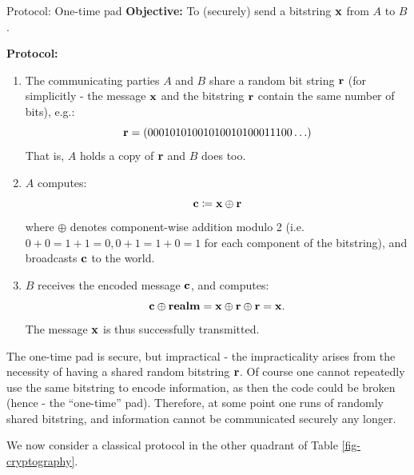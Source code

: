 \begin{blankbox}{Protocol: One-time pad}
    \textbf{Objective:} To (securely) send a bitstring $\mathbf{x}$ from $A$ to $B$.

    \noindent
    \textbf{Protocol:}
    \begin{enumerate}
        \item The communicating parties $A$ and $B$ share a random bit string $\mathbf{r}$ (for simplicitly - the message $\mathbf{x}$ and the bitstring $\mathbf{r}$ contain the same number of bits), e.g.:
        \begin{equation}
            \mathbf{r} = (00010101001010010100011100\ldots)
        \end{equation}
        That is, $A$ holds a copy of $\mathbf{r}$ and $B$ does too.
        \item $A$ computes:
        \begin{equation}
            \mathbf{c} \coloneqq \mathbf{x} \oplus \mathbf{r}
        \end{equation}
        where $\oplus$ denotes component-wise addition modulo 2 (i.e. $0 + 0 = 1 + 1 = 0, 0 + 1 = 1 + 0 = 1$ for each component of the bitstring), and broadcasts $\mathbf{c}$ to the world.
        \item $B$ receives the encoded message $\mathbf{c}$, and computes:
        \begin{equation}
            \mathbf{c} \oplus \mathbf{realm} = \mathbf{x} \oplus \mathbf{r} \oplus \mathbf{r} = \mathbf{x}.
        \end{equation}
        The message $\mathbf{x}$ is thus successfully transmitted.
    \end{enumerate}
\end{blankbox}
The one-time pad is secure, but impractical - the impracticality arises from the necessity of having a shared random bitstring $\mathbf{r}$. Of course one cannot repeatedly use the same bitstring to encode information, as then the code could be broken (hence - the ``one-time'' pad). Therefore, at some point one runs of randomly shared bitstring, and information cannot be communicated securely any longer.

We now consider a classical protocol in the other quadrant of Table \ref{fig-cryptography}.

